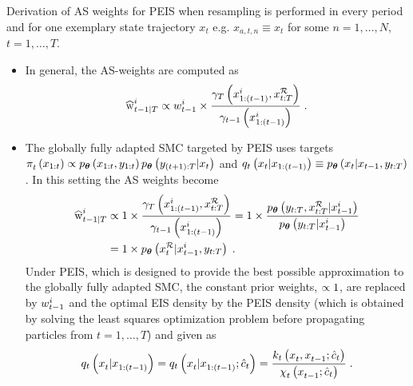 \newpage
Derivation of AS weights for PEIS when resampling is performed in every period and for one exemplary state trajectory $x_t$ e.g. $x_{a,t,n}\equiv x_t$ for some $n=1,\ldots,N$, $t=1,\ldots,T$.
\begin{itemize}
\item In general, the AS-weights are computed as
\begin{align*}
\asw 
\pt 
\wtt
\times 
\frac
{
\gamma_T
\left(
x_{1:(t-1)}^i, x^{\mathcal{R}}_{t:T}
\right)
}
{
\gamma_{t-1}
\left(
x_{1:(t-1)}^i
\right)
}\;.
\end{align*}
\item The globally fully adapted SMC targeted by PEIS uses targets 
$\pi_t^{}\left(x_{1:t}\right) 
\propto
p_{\boldsymbol{\theta}}\left(x_{1:t}, y_{1:t}\right) p_{\boldsymbol{\theta}}\left(y_{(t+1):T}\lvert x_{t}\right)$ and
$q_t\left(x_t \lvert x_{1:(t-1)}\right)
\equiv
p_{\boldsymbol{\theta}}\left(x_t \lvert x_{t-1}, y_{t:T}\right)$. In this setting the AS weights become
\begin{align*}
\asw 
&\pt 
1 
\times 
\frac
{
\gamma_T
\left(
x_{1:(t-1)}^i, x^{\mathcal{R}}_{t:T}
\right)
}
{
\gamma_{t-1}
\left(
x_{1:(t-1)}^i
\right)
}
=
1
\times
\frac
{ 
\p\left(
y_{t:T},x_{t:T}^{\mathcal{R}}\given x_{t-1}^i
\right)
}
{
\p\left(
y_{t:T}\given x_{t-1}^i
\right)
}
\\
&=
1
\times 
\p
\left(
x_t^{\mathcal{R}} \given x_{t-1}^i, y_{t:T}
\right)\;.
\end{align*}
Under PEIS, which is designed to provide the best possible approximation to the globally fully adapted SMC, the constant prior weights, $\propto 1$, are replaced by $w_{t-1}^i$ and the optimal EIS density by the PEIS density (which is obtained by solving the least squares optimization problem before propagating particles from $t=1,\ldots,T$) and given as
\begin{align*}
q_t\left(x_t^{} \lvert x_{1:(t-1)}^{}\right)= q_t\left(x_t^{} \lvert x_{1:(t-1)}^{}; \hat{c}_t\right) = \frac{k_{t}\left(x_{t}^{}, x_{t-1}^{}; \hat{c}_{t}\right) }{\chi_{t}^{}\left(x_{t-1}^{}; \hat{c}_{t}\right)}\;.
\end{align*}
\end{itemize}